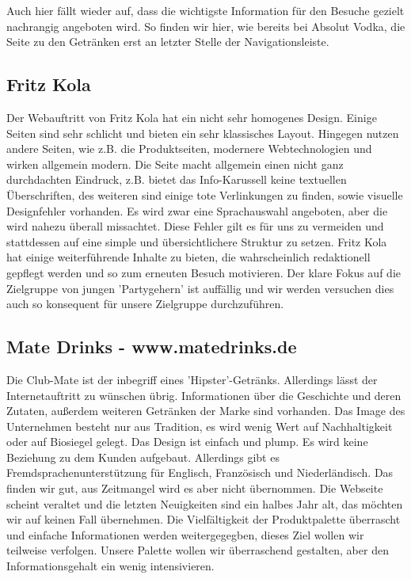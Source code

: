 \documentclass[12pt,a4paper,oneside,ngerman]{article}
\begin{document}
Auch hier fällt wieder auf, dass die wichtigste Information für den Besuche gezielt nachrangig angeboten wird. So finden wir hier, wie bereits bei Absolut Vodka, die Seite zu den Getränken erst an letzter Stelle der Navigationsleiste.

\subsection{Fritz Kola} %
Der Webauftritt von Fritz Kola hat ein nicht sehr homogenes Design. Einige Seiten sind sehr schlicht und bieten ein sehr klassisches Layout. 
Hingegen nutzen andere Seiten, wie z.B. die Produktseiten, modernere Webtechnologien und wirken allgemein modern.
Die Seite macht allgemein einen nicht ganz durchdachten Eindruck, z.B. bietet das Info-Karussell keine textuellen Überschriften, des weiteren sind einige tote Verlinkungen zu finden, sowie visuelle Designfehler vorhanden.
Es wird zwar eine Sprachauswahl angeboten, aber die wird nahezu überall missachtet.
Diese Fehler gilt es für uns zu vermeiden und stattdessen auf eine simple und übersichtlichere Struktur zu setzen.
Fritz Kola hat einige weiterführende Inhalte zu bieten, die wahrscheinlich redaktionell gepflegt werden und so zum erneuten Besuch motivieren.
Der klare Fokus auf die Zielgruppe von jungen 'Partygehern' ist auffällig und wir werden versuchen dies auch so konsequent für unsere Zielgruppe durchzuführen.

\subsection{Mate Drinks - www.matedrinks.de} %
Die Club-Mate ist der inbegriff eines 'Hipster'-Getränks. Allerdings lässt der Internetauftritt zu wünschen übrig. Informationen über die Geschichte und deren Zutaten, außerdem weiteren Getränken der Marke sind vorhanden. Das Image des Unternehmen besteht nur aus Tradition, es wird wenig Wert auf Nachhaltigkeit oder auf Biosiegel gelegt. Das Design ist einfach und plump. Es wird keine Beziehung zu dem Kunden aufgebaut. Allerdings gibt es Fremdsprachenunterstützung für Englisch, Französisch und Niederländisch. Das finden wir gut, aus Zeitmangel wird es aber nicht übernommen. Die Webseite scheint veraltet und die letzten Neuigkeiten sind ein halbes Jahr alt, das möchten wir auf keinen Fall übernehmen. Die Vielfältigkeit der Produktpalette überrascht und einfache Informationen werden weitergegegben, dieses Ziel wollen wir teilweise verfolgen. Unsere Palette wollen wir überraschend gestalten, aber den Informationsgehalt ein wenig intensivieren.
\end{document}

